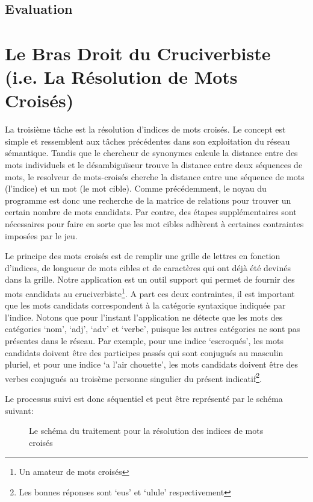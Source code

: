 \documentclass[a4paper, 12pt]{article}
\begin{document}
\subsection{Evaluation}


\section{Le Bras Droit du Cruciverbiste (i.e. La Résolution de Mots Croisés)}

La troisième tâche est la résolution d'indices de mots croisés. Le concept est simple et ressemblent aux tâches précédentes dans son exploitation du réseau sémantique. Tandis que le chercheur de synonymes calcule la distance entre des mots individuels et le désambiguïseur trouve la distance entre deux séquences de mots, le resolveur de mots-croisés cherche la distance entre une séquence de mots (l'indice) et un mot (le mot cible). Comme précédemment, le noyau du programme est donc une recherche de la matrice de relations pour trouver un certain nombre de mots candidats. Par contre, des étapes supplémentaires sont nécessaires pour faire en sorte que les mot cibles adhèrent à certaines contraintes imposées par le jeu.

Le principe des mots croisés est de remplir une grille de lettres en fonction d'indices, de longueur de mots cibles et de caractères qui ont déjà été devinés dans la grille. Notre application est un outil support qui permet de fournir des mots candidats au cruciverbiste\footnote{Un amateur de mots croisés}. A part ces deux contraintes, il est important que les mots candidats correspondent à la catégorie syntaxique indiquée par l'indice. Notons que pour l'instant l'application ne détecte que les mots des catégories \lq{nom}\rq, \lq{adj}\rq, \lq{adv}\rq{} et \lq{verbe}\rq, puisque les autres catégories ne sont pas présentes dans le réseau. Par exemple, pour une indice \lq{escroqués}\rq, les mots candidats doivent être des participes passés qui sont conjugués au masculin pluriel, et pour une indice \lq{a l'air chouette}\rq, les mots candidats doivent être des verbes conjugués au troisème personne singulier du présent indicatif\footnote{Les bonnes réponses sont \lq{eus}\rq{}  et \lq{ulule}\rq{} respectivement}.

Le processus suivi est donc séquentiel et peut être représenté par le schéma suivant:   

\begin{figure}[!ht]
\centering
\def\svgwidth{\columnwidth}
%

\caption{Le schéma du traitement pour la résolution des indices de mots croisés}
\label{fig:schema_crosswords}
\end{figure}
\end{document}
